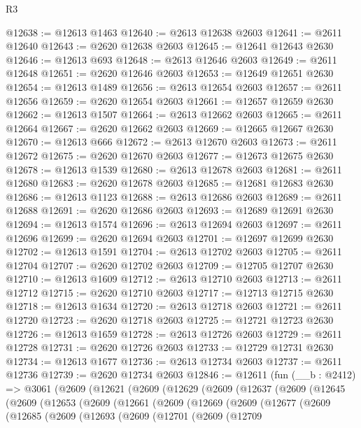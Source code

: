 \begin{lexlean}{R3}
\begin{coremodule}
@12638 := @12613 @1463
@12640 := @2613 @12638 @2603
@12641 := @2611 @12640
@12643 := @2620 @12638 @2603
@12645 := @12641 @12643 @2630
@12646 := @12613 @693
@12648 := @2613 @12646 @2603
@12649 := @2611 @12648
@12651 := @2620 @12646 @2603
@12653 := @12649 @12651 @2630
@12654 := @12613 @1489
@12656 := @2613 @12654 @2603
@12657 := @2611 @12656
@12659 := @2620 @12654 @2603
@12661 := @12657 @12659 @2630
@12662 := @12613 @1507
@12664 := @2613 @12662 @2603
@12665 := @2611 @12664
@12667 := @2620 @12662 @2603
@12669 := @12665 @12667 @2630
@12670 := @12613 @666
@12672 := @2613 @12670 @2603
@12673 := @2611 @12672
@12675 := @2620 @12670 @2603
@12677 := @12673 @12675 @2630
@12678 := @12613 @1539
@12680 := @2613 @12678 @2603
@12681 := @2611 @12680
@12683 := @2620 @12678 @2603
@12685 := @12681 @12683 @2630
@12686 := @12613 @1123
@12688 := @2613 @12686 @2603
@12689 := @2611 @12688
@12691 := @2620 @12686 @2603
@12693 := @12689 @12691 @2630
@12694 := @12613 @1574
@12696 := @2613 @12694 @2603
@12697 := @2611 @12696
@12699 := @2620 @12694 @2603
@12701 := @12697 @12699 @2630
@12702 := @12613 @1591
@12704 := @2613 @12702 @2603
@12705 := @2611 @12704
@12707 := @2620 @12702 @2603
@12709 := @12705 @12707 @2630
@12710 := @12613 @1609
@12712 := @2613 @12710 @2603
@12713 := @2611 @12712
@12715 := @2620 @12710 @2603
@12717 := @12713 @12715 @2630
@12718 := @12613 @1634
@12720 := @2613 @12718 @2603
@12721 := @2611 @12720
@12723 := @2620 @12718 @2603
@12725 := @12721 @12723 @2630
@12726 := @12613 @1659
@12728 := @2613 @12726 @2603
@12729 := @2611 @12728
@12731 := @2620 @12726 @2603
@12733 := @12729 @12731 @2630
@12734 := @12613 @1677
@12736 := @2613 @12734 @2603
@12737 := @2611 @12736
@12739 := @2620 @12734 @2603
@12846 := @12611
    (fun (__b : @2412) =>
    @3061
      (@2609
        (@12621
          (@2609
            (@12629
              (@2609
                (@12637
                  (@2609
                    (@12645
                      (@2609
                        (@12653
                          (@2609
                            (@12661
                              (@2609
                                (@12669
                                  (@2609
                                    (@12677
                                      (@2609
                                        (@12685
                                          (@2609
                                            (@12693
                                              (@2609
                                                (@12701
                                                  (@2609
                                                    (@12709

\end{coremodule}
\end{lexlean}
